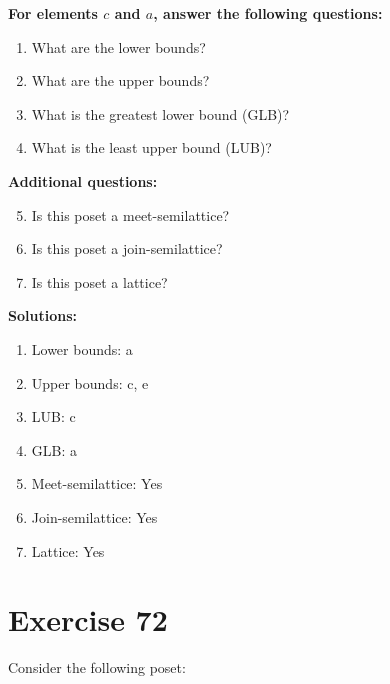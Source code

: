 \documentclass{article}
\begin{document}
    \textbf{For elements $c$ and $a$, answer the following questions:}
\begin{enumerate}
    \item What are the lower bounds?
    \item What are the upper bounds?
    \item What is the greatest lower bound (GLB)?
    \item What is the least upper bound (LUB)?
\end{enumerate}
    \hspace*{3ex} \textbf{Additional questions:}
\begin{enumerate}
    \setcounter{enumi}{4}
    \item Is this poset a meet-semilattice?
    \item Is this poset a join-semilattice?
    \item Is this poset a lattice?
\end{enumerate}

\textbf{Solutions:}
\begin{enumerate}
    \item Lower bounds: {a}
    \item Upper bounds: {c, e}
    \item LUB: c
    \item GLB: a
    \item Meet-semilattice: Yes
    \item Join-semilattice: Yes
    \item Lattice: Yes
\end{enumerate}
\newpage
\section*{Exercise 72}
Consider the following poset:
\begin{center}
\end{center}
\end{document}
